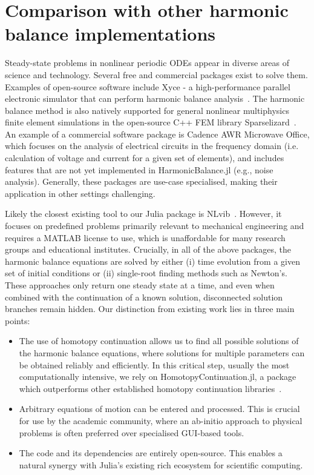 \section{Comparison with other harmonic balance implementations}

Steady-state problems in nonlinear periodic ODEs appear in diverse areas of science and technology. Several free and commercial packages exist to solve them. Examples of open-source software include Xyce - a high-performance parallel electronic simulator that can perform harmonic balance analysis~\cite{verley2018xyce}. The harmonic balance method is also natively supported for general nonlinear multiphysics finite element simulations in the open-source C++ FEM library Sparselizard~\cite{halbach2017sparselizard}. An example of a commercial software package is Cadence AWR Microwave Office, which focuses on the analysis of electrical circuits in the frequency domain (i.e. calculation of voltage and current for a given set of elements), and includes features that are not yet implemented in HarmonicBalance.jl (e.g., noise analysis). Generally, these packages are use-case specialised, making their application in other settings challenging.

Likely the closest existing tool to our Julia package is NLvib~\cite{Krack_2019}. However, it focuses
on predefined problems primarily relevant to mechanical engineering and requires a MATLAB license to use, which is unaffordable for many research groups and educational institutes. Crucially, in all of the above packages, the harmonic balance equations are solved by either (i) time evolution from a given set of initial conditions or (ii) single-root finding methods such as Newton's. These approaches only return one steady state at a time, and even when combined with the continuation of a known solution, disconnected solution branches remain hidden. Our distinction from existing work lies in three main points:
\begin{itemize}
	\item The use of homotopy continuation allows us to find all possible solutions of the harmonic balance equations, where solutions for multiple parameters can be obtained reliably and efficiently. In this critical step, usually the most computationally intensive, we rely on HomotopyContinuation.jl, a package which outperforms other established homotopy continuation libraries~\cite{Breiding_2018}.
	\item Arbitrary equations of motion can be entered and processed. This is crucial for use by the academic community, where an ab-initio approach to physical problems is often preferred over specialised GUI-based tools.
	\item The code and its dependencies are entirely open-source. This enables a natural synergy with Julia's existing rich ecosystem for scientific computing.
\end{itemize}
	
